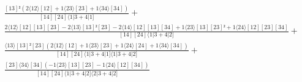 \documentclass[varwidth, border=5pt]{standalone}
\begin{document}
\begin{my}
$\begin{gathered}
\scriptscriptstyle\frac{[13]²(2⟨12⟩[12]+1⟨23⟩[23]+1⟨34⟩[34])}{[14][24]⟨1|3+4|1]} +\\
\scriptscriptstyle\frac{2⟨12⟩[12][13][23]-2⟨13⟩[13]²[23]-2⟨14⟩[12][13][34]+1⟨23⟩[13][23]²+1⟨24⟩[12][23][34]}{[14][24]⟨1|3+4|2]} +\\
\scriptscriptstyle\frac{⟨13⟩[13]²[23](2⟨12⟩[12]+1⟨23⟩[23]+1⟨24⟩[24]+1⟨34⟩[34])}{[14][24]⟨1|3+4|1]⟨1|3+4|2]} +\\
\scriptscriptstyle\frac{[23]⟨34⟩[34](-1⟨23⟩[13][23]-1⟨24⟩[12][34])}{[14][24]⟨1|3+4|2]⟨2|3+4|2]} \phantom{+}
\end{gathered}$
\end{my}
\end{document}
